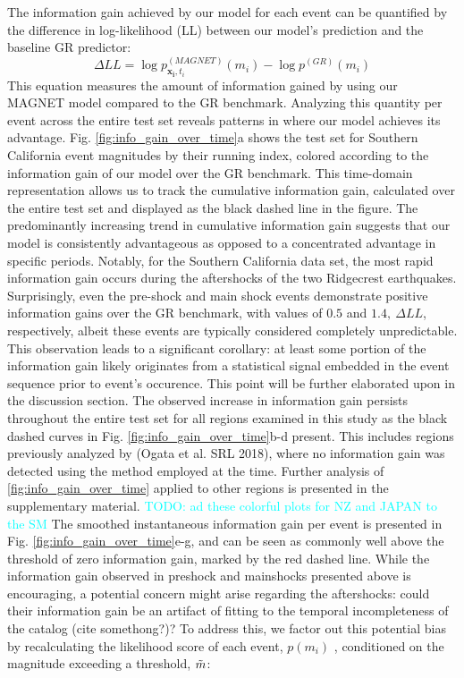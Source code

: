 \documentclass[pdflatex]{sn-jnl}
\newcommand{\neri}[1]{{\textcolor{cyan}{#1}}}
\begin{document}
The information gain achieved by our model for each event can be quantified by the difference in log-likelihood (LL) between our model's prediction and the baseline GR predictor:
\begin{equation}
    \Delta LL = \log{p_{\pmb{x_i}, t_i}^{(MAGNET)}(m_i)} - \log{p^{(GR)}(m_i)}
    \label{eq:information_gain}
\end{equation}
This equation measures the amount of information gained by using our MAGNET model compared to the GR benchmark. Analyzing this quantity per event across the entire test set reveals patterns in where our model achieves its advantage. Fig. \ref{fig:info_gain_over_time}a shows the test set for Southern California event magnitudes by their running index, colored according to the information gain of our model over the GR benchmark. This time-domain representation allows us to track the cumulative information gain, calculated over the entire test set and displayed as the black dashed line in the figure. The predominantly increasing trend in cumulative information gain suggests that our model is consistently advantageous as opposed to a concentrated advantage in specific periods. Notably, for the Southern California data set, the most rapid information gain occurs during the aftershocks of the two Ridgecrest earthquakes. Surprisingly, even the pre-shock and main shock events demonstrate positive information gains over the GR benchmark, with values of $0.5$ and $1.4, \ \Delta LL$, respectively, albeit these events are typically considered completely unpredictable. This observation leads to a significant corollary: at least some portion of the information gain likely originates from a statistical signal embedded in the event sequence prior to event's occurence. This point will be further elaborated upon in the discussion section.
\newline
The observed increase in information gain persists throughout the entire test set for all regions examined in this study as the black dashed curves in Fig. \ref{fig:info_gain_over_time}b-d present. This includes regions previously analyzed by (Ogata et al. SRL 2018), where no information gain was detected using the method employed at the time. Further analysis of \ref{fig:info_gain_over_time} applied to other regions is presented in the supplementary material. \neri{TODO: ad these colorful plots for NZ and JAPAN to the SM}
The smoothed instantaneous information gain per event is presented in Fig. \ref{fig:info_gain_over_time}e-g, and can be seen as commonly well above the threshold of zero information gain, marked by the red dashed line.
\newline
While the information gain observed in preshock and mainshocks presented above is encouraging, a potential concern might arise regarding the aftershocks: could their information gain be an artifact of fitting to the temporal incompleteness of the catalog (cite somethong?)? To address this, we factor out this potential bias by recalculating the likelihood score of each event, $p(m_i)$ , conditioned on the magnitude exceeding a threshold, $\Tilde{m}$:
\end{document}
